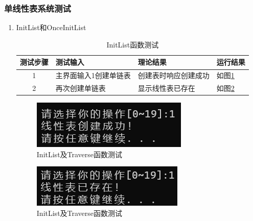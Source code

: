 \documentclass[supercite]{Experimental_Report}
\theoremstyle{definition}
\begin{document}
\subsubsection{单线性表系统测试}
\begin{enumerate}
	\renewcommand{\labelenumi}{\theenumi)}
	\item InitList和OnceInitList
	\begin{table}[h!]
		\begin{center}
			\caption{InitList函数测试}
			\begin{tabular}{|c|p{4cm}<{\centering}|p{4cm}<{\centering}|p{4cm}<{\centering}|} %
				\hline
				\textbf{测试步骤} & \textbf{测试输入} & \textbf{理论结果} & \textbf{运行结果} \\
				\hline
				1 & 主界面输入1创建单链表 & 创建表时响应创建成功& 如图\ref{fig1-1-1}\\
				\hline
				2 & 再次创建单链表 & 显示线性表已存在 & 如图\ref{fig1-1-2}\\
				\hline
			\end{tabular}
		\end{center}
	\end{table}
	
	
	\begin{figure}[H] %
		\begin{center}
			\includegraphics[width=0.5\linewidth]{images/linklist/1-1.png}
			\caption{InitList及Traverse函数测试}
			\label{fig1-1-1}
		\end{center}
	\end{figure}
	\begin{figure}[H] %
		\begin{center}
			\includegraphics[width=0.5\linewidth]{images/linklist/1-2.png}
			\caption{InitList及Traverse函数测试}
			\label{fig1-1-2}
		\end{center}
	\end{figure}
	

\end{enumerate}
\end{document}
